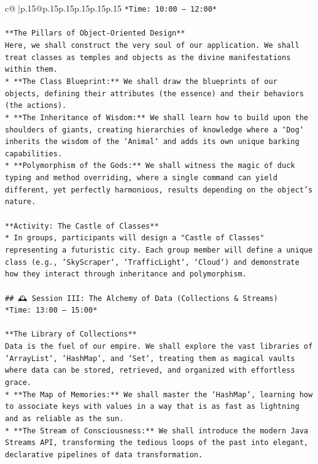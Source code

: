 \documentclass{article}
\begin{document}
{\begin{supertabular}{c@{$\;$}|p{.15\linewidth}@{}p{.15\linewidth}p{.15\linewidth}p{.15\linewidth}p{.15\linewidth}p{.15\linewidth}}
{{{\texttt{*Time: 10:00 – 12:00*} \\
\\ 
\texttt{**The Pillars of Object{-}Oriented Design**} \\
\texttt{Here, we shall construct the very soul of our application. We shall treat classes as temples and objects as the divine manifestations within them.} \\
\texttt{*   **The Class Blueprint:** We shall draw the blueprints of our objects, defining their attributes (the essence) and their behaviors (the actions).} \\
\texttt{*   **The Inheritance of Wisdom:** We shall learn how to build upon the shoulders of giants, creating hierarchies of knowledge where a `Dog` inherits the wisdom of the `Animal` and adds its own unique barking capabilities.} \\
\texttt{*   **Polymorphism of the Gods:** We shall witness the magic of duck typing and method overriding, where a single command can yield different, yet perfectly harmonious, results depending on the object's nature.} \\
\\ 
\texttt{**Activity: The Castle of Classes**} \\
\texttt{*   In groups, participants will design a "Castle of Classes" representing a futuristic city. Each group member will define a unique class (e.g., `SkyScraper`, `TrafficLight`, `Cloud`) and demonstrate how they interact through inheritance and polymorphism.} \\
\\ 
\texttt{\#\# 🕰️ Session III: The Alchemy of Data (Collections \& Streams)} \\
\texttt{*Time: 13:00 – 15:00*} \\
\\ 
\texttt{**The Library of Collections**} \\
\texttt{Data is the fuel of our empire. We shall explore the vast libraries of `ArrayList`, `HashMap`, and `Set`, treating them as magical vaults where data can be stored, retrieved, and organized with effortless grace.} \\
\texttt{*   **The Map of Memories:** We shall master the `HashMap`, learning how to associate keys with values in a way that is as fast as lightning and as reliable as the sun.} \\
\texttt{*   **The Stream of Consciousness:** We shall introduce the modern Java Streams API, transforming the tedious loops of the past into elegant, declarative pipelines of data transformation.} \\
}}}
\end{supertabular}}
\end{document}
